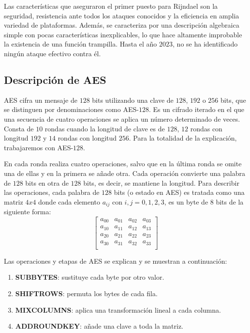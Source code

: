     Las características que aseguraron el primer puesto para Rijndael son la seguridad, resistencia ante todos los ataques conocidos y la eficiencia en amplia variedad de plataformas. Además, se caracteriza por una descripción algebraica simple con pocas características inexplicables, lo que hace altamente improbable la existencia de una función trampilla. Hasta el año $2023$, no se ha identificado ningún ataque efectivo contra él.

    \subsection{Descripción de AES}
    
    AES cifra un mensaje de $128$ bits utilizando una clave de $128$, $192$ o $256$ bits, que se distinguen por denominaciones como AES-$128$. Es un cifrado iterado en el que una secuencia de cuatro operaciones se aplica un número determinado de veces. Consta de $10$ rondas cuando la longitud de clave es de $128$, $12$ rondas con longitud $192$ y $14$ rondas con longitud $256$. Para la totalidad de la explicación, trabajaremos con AES-$128$.
    
    En cada ronda realiza cuatro operaciones, salvo que en la última ronda se omite una de ellas y en la primera se añade otra. Cada operación convierte una palabra de $128$ bits en otra de $128$ bits, es decir, se mantiene la longitud. Para describir las operaciones, cada palabra de $128$ bits (o estado en AES) es tratada como una matriz $4x4$ donde cada elemento $a_{ij}$ con $i,j = 0, 1, 2, 3$, es un byte de $8$ bits de la siguiente forma:
    \begin{equation}
        \begin{bmatrix}
            a_{00} & a_{01} & a_{02} & a_{03} \\
            a_{10} & a_{11} & a_{12} & a_{13} \\
            a_{20} & a_{21} & a_{22} & a_{23} \\
            a_{30} & a_{31} & a_{32} & a_{33} \\
        \end{bmatrix}
    \end{equation}
    
    Las operaciones y etapas de AES se explican y se muestran a continuación:
    \begin{enumerate}
        \item \textbf{SUBBYTES}: sustituye cada byte por otro valor.
        \item \textbf{SHIFTROWS}: permuta los bytes de cada fila.
        \item \textbf{MIXCOLUMNS}: aplica una transformación lineal a cada columna.
        \item \textbf{ADDROUNDKEY}: añade una clave a toda la matriz.
    \end{enumerate}
    
